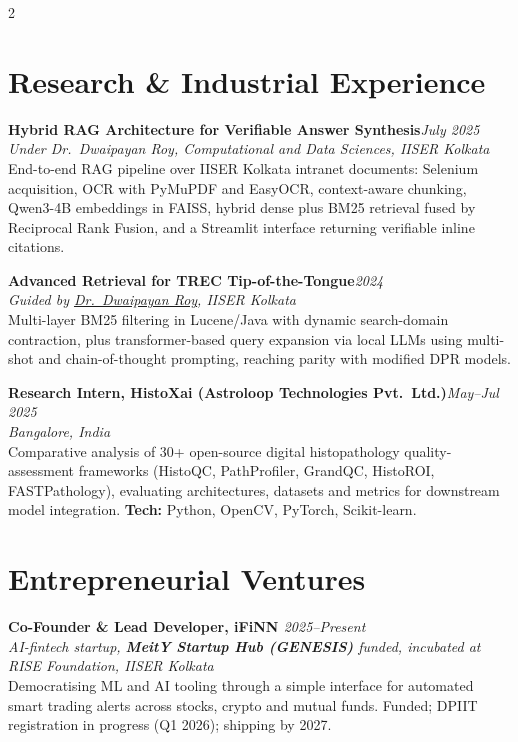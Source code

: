 \documentclass[a4paper,10.5pt]{extarticle}
\newcommand{\entryv}[4]{%
  {\normalsize\textbf{#1}}\hfill{\small\itshape\textcolor{mutedtext}{#2}}\\[0.04em]
  {\small\itshape\textcolor{mutedtext}{#3}}\\[0.04em]
  {\small #4}\par\vspace{3pt}%
}
\begin{document}
\newpage
{}
\begin{paracol}{2}

\section{Research \& Industrial Experience}

\entryv{Hybrid RAG Architecture for Verifiable Answer Synthesis}{July 2025}{Under Dr.~Dwaipayan Roy, Computational and Data Sciences, IISER Kolkata}{%
End-to-end RAG pipeline over IISER Kolkata intranet documents: Selenium acquisition, OCR with PyMuPDF and EasyOCR, context-aware chunking, Qwen3-4B embeddings in FAISS, hybrid dense plus BM25 retrieval fused by Reciprocal Rank Fusion, and a Streamlit interface returning verifiable inline citations.}

\entryv{Advanced Retrieval for TREC Tip-of-the-Tongue}{2024}{Guided by \href{https://dwaipayanroy.github.io/}{Dr.~Dwaipayan Roy}, IISER Kolkata}{%
Multi-layer BM25 filtering in Lucene/Java with dynamic search-domain contraction, plus transformer-based query expansion via local LLMs using multi-shot and chain-of-thought prompting, reaching parity with modified DPR models.}

\entryv{Research Intern, HistoXai (Astroloop Technologies Pvt.\ Ltd.)}{May--Jul 2025}{Bangalore, India}{%
Comparative analysis of 30+ open-source digital histopathology quality-assessment frameworks (HistoQC, PathProfiler, GrandQC, HistoROI, FASTPathology), evaluating architectures, datasets and metrics for downstream model integration. \textbf{Tech:} Python, OpenCV, PyTorch, Scikit-learn.}

\section{Entrepreneurial Ventures}

\entryv{Co-Founder \& Lead Developer, iFiNN \href{https://synapse-iiserk.github.io/}{\faGlobe}}{2025--Present}{AI-fintech startup, \textbf{MeitY Startup Hub (GENESIS)} funded, incubated at RISE Foundation, IISER Kolkata}{%
Democratising ML and AI tooling through a simple interface for automated smart trading alerts across stocks, crypto and mutual funds. Funded; DPIIT registration in progress (Q1 2026); shipping by 2027.}


\end{paracol}
\end{document}
